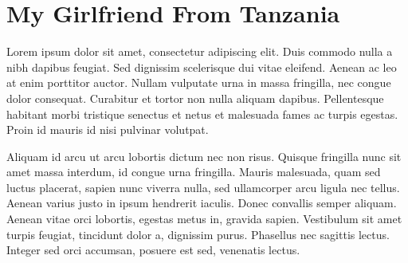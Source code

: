 \chapter{My Girlfriend From Tanzania}

Lorem ipsum dolor sit amet, consectetur adipiscing elit. Duis commodo nulla a nibh dapibus feugiat. Sed dignissim scelerisque dui vitae eleifend. Aenean ac leo at enim porttitor auctor. Nullam vulputate urna in massa fringilla, nec congue dolor consequat. Curabitur et tortor non nulla aliquam dapibus. Pellentesque habitant morbi tristique senectus et netus et malesuada fames ac turpis egestas. Proin id mauris id nisi pulvinar volutpat.

Aliquam id arcu ut arcu lobortis dictum nec non risus. Quisque fringilla nunc sit amet massa interdum, id congue urna fringilla. Mauris malesuada, quam sed luctus placerat, sapien nunc viverra nulla, sed ullamcorper arcu ligula nec tellus. Aenean varius justo in ipsum hendrerit iaculis. Donec convallis semper aliquam. Aenean vitae orci lobortis, egestas metus in, gravida sapien. Vestibulum sit amet turpis feugiat, tincidunt dolor a, dignissim purus. Phasellus nec sagittis lectus. Integer sed orci accumsan, posuere est sed, venenatis lectus.
